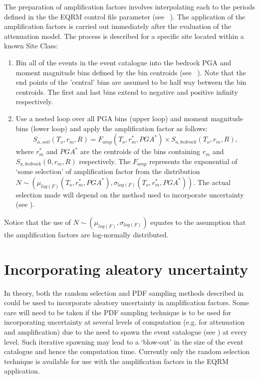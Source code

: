 The preparation of amplification factors involves interpolating each
to the periods defined in the the EQRM control file parameter (see
~). The application of the
amplification factors is carried out immediately after the
evaluation of the attenuation model. The process is described for a
specific site located within a known Site Class:
\begin{enumerate}
\item Bin all of the events in the event catalogue into the
bedrock PGA and moment magnitude bins defined by the bin centroids
(see ~). Note that the end points of
the 'central' bins are assumed to be half way between the bin
centroids. The first and last bins extend to negative and positive
infinity respectively.
\item Use a nested loop over all PGA bins (upper loop) and moment
magnitude bins (lower loop) and apply the amplification factor as
follows:
\begin{equation}
S_{a,soil}(T_o,r_m,R)= F_{amp}(T_o,r_m^*,PGA^*) \times
S_{a,bedrock}(T_o,r_m,R),
\end{equation}
where $r_m^*$ and $PGA^*$ are the centroids of the bins containing
$r_m$ and \newline $S_{a,bedrock}(0,r_m,R)$ respectively. The
$F_{amp}$ represents the exponential of `some selection' of
amplification factor from the distribution \newline \mbox{$N \sim
(\mu_{log(F)}(T_o,r_m^*,PGA^*),\sigma_{log(F)}(T_o,r_m^*,PGA^*))$}.
The actual selection  made will depend on the method used to
incorporate uncertainty (see ).
\end{enumerate}
Notice that the use of $N \sim (\mu_{log(F)},\sigma_{log(F)})$
equates to the assumption that the amplification factors are
log-normally distributed.

\section{Incorporating aleatory uncertainty}
\label{sec:regolith-incorp-unc}


In theory, both the random selection and PDF sampling methods
described in  could be used to incorporate
aleatory uncertainty in amplification factors. Some care will need
to be taken if the PDF sampling technique is to be used for
incorporating uncertainty at several levels  of computation (e.g.
for attenuation and amplification) due to the need to spawn the
event catalogue (see ) at every level. Such
iterative spawning may lead to a `blow-out' in the size of the event
catalogue and hence the computation time. Currently only the random
selection technique is available for use with the amplification
factors in the EQRM application.

